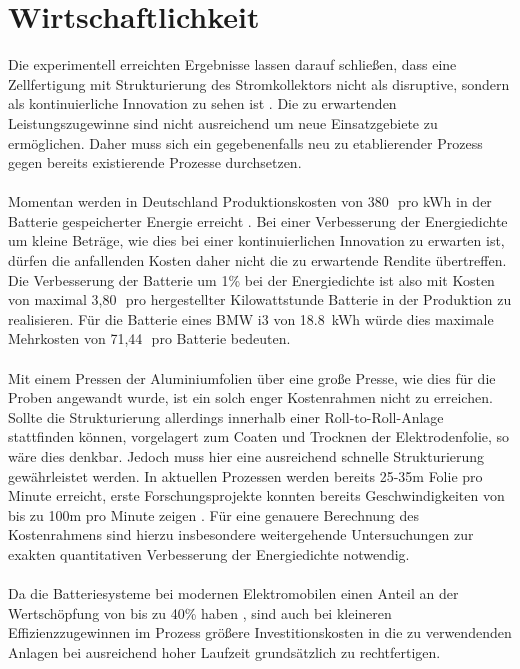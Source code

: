 \documentclass[a4paper, 11pt, headsepline,footsepline,twoside,abstract]{scrbook}
\newcommand{\euro}{\,\texteuro\ } %
\begin{document}
\section{Wirtschaftlichkeit}
Die experimentell erreichten Ergebnisse lassen darauf schließen, dass eine Zellfertigung mit Strukturierung des Stromkollektors nicht als disruptive, sondern als kontinuierliche Innovation zu sehen ist \cite{bower1995disruptive}. Die zu erwartenden Leistungszugewinne sind nicht ausreichend um neue Einsatzgebiete zu ermöglichen. Daher muss sich ein gegebenenfalls neu zu etablierender Prozess gegen bereits existierende Prozesse durchsetzen.
\\\\
Momentan werden in Deutschland Produktionskosten von 380\euro pro kWh in der Batterie gespeicherter Energie erreicht \cite{fortschrittsbericht_npe}. Bei einer Verbesserung der Energiedichte um kleine Beträge, wie dies bei einer kontinuierlichen Innovation zu erwarten ist, dürfen die anfallenden Kosten daher nicht die zu erwartende Rendite übertreffen. Die Verbesserung der Batterie um 1\% bei der Energiedichte ist also mit Kosten von maximal 3,80\euro pro hergestellter Kilowattstunde Batterie in der Produktion zu realisieren. Für die Batterie eines BMW i3 von \SI{18.8}{\kWh} \cite{bmw_i3} würde dies maximale Mehrkosten von 71,44\euro pro Batterie bedeuten.
\\\\
Mit einem Pressen der Aluminiumfolien über eine große Presse, wie dies für die Proben angewandt wurde, ist ein solch enger Kostenrahmen nicht zu erreichen. Sollte die Strukturierung allerdings innerhalb einer Roll-to-Roll-Anlage stattfinden können, vorgelagert zum Coaten und Trocknen der Elektrodenfolie, so wäre dies denkbar. Jedoch muss hier eine ausreichend schnelle Strukturierung gewährleistet werden. In aktuellen Prozessen werden bereits 25-35m Folie pro Minute erreicht, erste Forschungsprojekte konnten bereits Geschwindigkeiten von bis zu 100m pro Minute zeigen \cite{kit_rekord_100m}. Für eine genauere Berechnung des Kostenrahmens sind hierzu insbesondere weitergehende Untersuchungen zur exakten quantitativen Verbesserung der Energiedichte notwendig.
\\\\
Da die Batteriesysteme bei modernen Elektromobilen einen Anteil an der Wertschöpfung von bis zu 40\% haben \cite{fortschrittsbericht_npe}, sind auch bei kleineren Effizienzzugewinnen im Prozess größere Investitionskosten in die zu verwendenden Anlagen  bei ausreichend hoher Laufzeit grundsätzlich zu rechtfertigen.
\newpage
\end{document}
